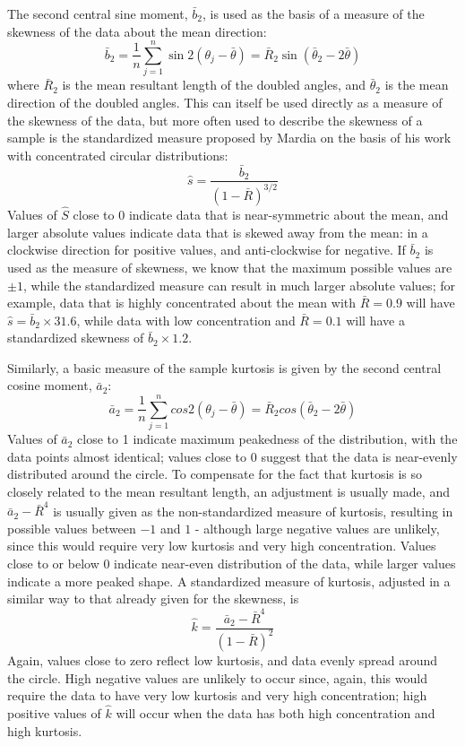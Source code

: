 \documentclass[../../ArchStats.tex]{subfiles}
\begin{document}
The second central sine moment, $\bar{b}_2$, is used as the basis of a measure of the skewness of the data about the mean direction:
\[ \bar{b}_2 = \frac{1}{n} \sum_{j=1}^n \sin 2(\theta_j-\bar{\theta}) = \bar{R}_2 \sin(\bar{\theta}_2 - 2\bar{\theta}) \]
where $\bar{R}_2$ is the mean resultant length of the doubled angles, and $\bar{\theta}_2$ is the mean direction of the doubled angles. This can itself be used directly as a measure of the skewness of the data, but more often used to describe the skewness of a sample is the standardized measure proposed by Mardia \cite{Mardia1972} on the basis of his work with concentrated circular distributions:
\[\hat{s} = \frac{\bar{b}_2}{(1-\bar{R})^{3/2}}\]
Values of $\hat{S}$ close to 0 indicate data that is near-symmetric about the mean, and larger  absolute values indicate data that is skewed away from the mean: in a clockwise direction for positive values, and anti-clockwise for negative. If $\bar{b}_2$ is used as the measure of skewness, we know that the maximum possible values are $\pm 1$, while the standardized measure can result in much larger absolute values; for example, data that is highly concentrated about the mean with $\bar{R} = 0.9$ will have $\hat{s} = \bar{b}_2 \times 31.6$, while data with low concentration and $\bar{R} = 0.1$ will have a standardized skewness of $\bar{b}_2 \times 1.2$.

Similarly, a basic measure of the sample kurtosis is given by the second central cosine moment, $\bar{a}_2$:
\[ \bar{a}_2 = \frac{1}{n} \sum_{j=1}^n cos 2(\theta_j-\bar{\theta}) = \bar{R}_2 cos(\bar{\theta}_2 - 2\bar{\theta}) \]
Values of $\bar{a}_2$ close to 1 indicate maximum peakedness of the distribution, with the data points almost identical; values close to 0 suggest that the data is near-evenly distributed around the circle. To compensate for the fact that kurtosis is so closely related to the mean resultant length, an adjustment is usually made, and $\bar{a}_2 - \bar{R}^4$ is usually given as the non-standardized measure of kurtosis, resulting in possible values between $-1$ and $1$ - although large negative values are unlikely, since this would require very low kurtosis and very high concentration. Values close to or below 0 indicate near-even distribution of the data, while larger values indicate a more peaked shape. A standardized measure of kurtosis, adjusted in a similar way to that already given for the skewness, is
\[ \hat{k} = \frac{\bar{a}_2 - \bar{R}^4}{(1-\bar{R})^2}\]
Again, values close to zero reflect low kurtosis, and data evenly spread around the circle. High negative values are unlikely to occur since, again, this would require the data to have very low kurtosis and very high concentration; high positive values of $\hat{k}$ will occur when the data has both high concentration and high kurtosis.
\end{document}
